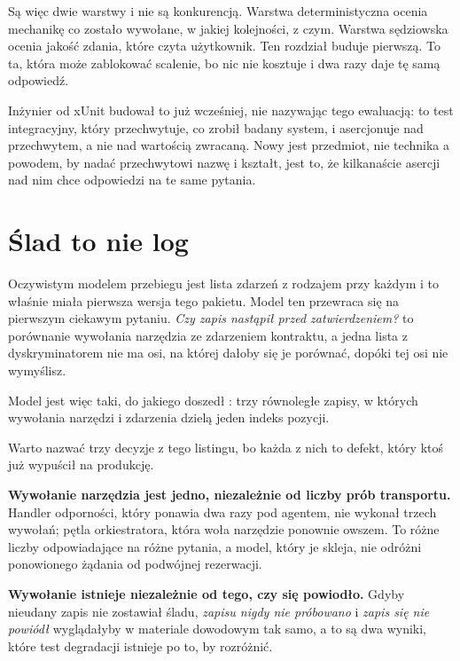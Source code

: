\noindent
Są więc dwie warstwy i nie są konkurencją. Warstwa deterministyczna ocenia
mechanikę \dash{} co zostało wywołane, w jakiej kolejności, z czym.
Warstwa sędziowska ocenia jakość zdania, które czyta użytkownik. Ten
rozdział buduje pierwszą. To ta, która może zablokować scalenie, bo nic nie
kosztuje i dwa razy daje tę samą odpowiedź.

\begin{csbox}
Inżynier od xUnit budował to już wcześniej, nie nazywając tego ewaluacją:
to test integracyjny, który przechwytuje, co zrobił badany system, i
asercjonuje nad przechwytem, a nie nad wartością zwracaną. Nowy jest
przedmiot, nie technika \dash{} a powodem, by nadać przechwytowi nazwę i
kształt, jest to, że kilkanaście asercji nad nim chce odpowiedzi na te same
pytania.
\end{csbox}

\section{Ślad to nie log}
\label{sec:ch14-trace}

Oczywistym modelem przebiegu jest lista zdarzeń z rodzajem przy każdym i to
właśnie miała pierwsza wersja tego pakietu. Model ten przewraca się na
pierwszym ciekawym pytaniu. \emph{Czy zapis nastąpił przed zatwierdzeniem?}
to porównanie wywołania narzędzia ze zdarzeniem kontraktu, a jedna lista z
dyskryminatorem nie ma osi, na której dałoby się je porównać, dopóki tej
osi nie wymyślisz.

Model jest więc taki, do jakiego doszedł : trzy
równoległe zapisy, w których wywołania narzędzi i zdarzenia dzielą jeden
indeks pozycji.


\noindent
Warto nazwać trzy decyzje z tego listingu, bo każda z nich to defekt, który
ktoś już wypuścił na produkcję.

\textbf{Wywołanie narzędzia jest jedno, niezależnie od liczby prób
transportu.} Handler odporności, który ponawia dwa razy pod agentem, nie
wykonał trzech wywołań; pętla orkiestratora, która woła narzędzie
ponownie \dash{} owszem. To różne liczby odpowiadające na różne pytania, a
model, który je skleja, nie odróżni ponowionego żądania od podwójnej
rezerwacji.

\textbf{Wywołanie istnieje niezależnie od tego, czy się powiodło.} Gdyby
nieudany zapis nie zostawiał śladu, \emph{zapisu nigdy nie próbowano} i
\emph{zapis się nie powiódł} wyglądałyby w materiale dowodowym tak samo, a
to są dwa wyniki, które test degradacji istnieje po to, by rozróżnić.

